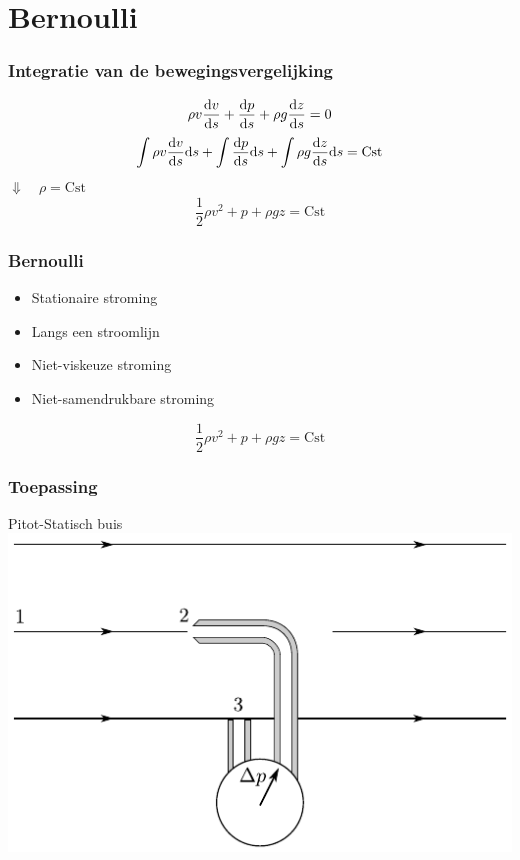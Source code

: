 \documentclass[t]{beamer}
\begin{document}
	\section{Bernoulli}
	\begin{frame}
		\frametitle{Integratie van de bewegingsvergelijking}
		\vspace{1cm}
		\begin{equation*}
			\rho v \frac{\mathrm{d} v}{\mathrm{d} s} + \frac{\mathrm{d} p}{\mathrm{d} s} + \rho g \frac{\mathrm{d} z}{\mathrm{d} s} = 0
		\end{equation*}
		\pause
		\vspace{0.5cm}
		\begin{equation*}
			\int \rho v \frac{\mathrm{d} v}{\mathrm{d} s} \mathrm{d} s + \int \frac{\mathrm{d} p}{\mathrm{d} s} \mathrm{d} s + \int \rho g \frac{\mathrm{d} z}{\mathrm{d} s}  \mathrm{d} s = \textrm{Cst}
		\end{equation*}
		\pause
        \hspace{5cm} $\Downarrow \quad \rho = \textrm{Cst}$ 
		\begin{equation}
			\frac{1}{2} \rho v^2 + p + \rho g z = \textrm{Cst}
			\label{eqn:vergelijking van Bernoulli}
		\end{equation}
  	\end{frame}
  	\begin{frame}
  		\frametitle{Bernoulli}
  		\begin{itemize}
  			\pause
  			\item Stationaire stroming
  			\pause
  			\item Langs een stroomlijn
  			\pause
  			\item Niet-viskeuze stroming
  			\pause
  			\item Niet-samendrukbare stroming
  		\end{itemize}
  		\pause
  		\vspace{1cm}
  		\begin{equation*}
			\frac{1}{2} \rho v^2 + p + \rho g z = \textrm{Cst}
		\end{equation*}
  	\end{frame}
	\begin{frame}
		\frametitle{Toepassing}
		Pitot-Statisch buis
		\pause
		\vspace{0.5cm}
		\center
		\includegraphics{../fig/deeltjesvergelijkingen/Pitotstatischbuis}
	\end{frame}
\end{document}
